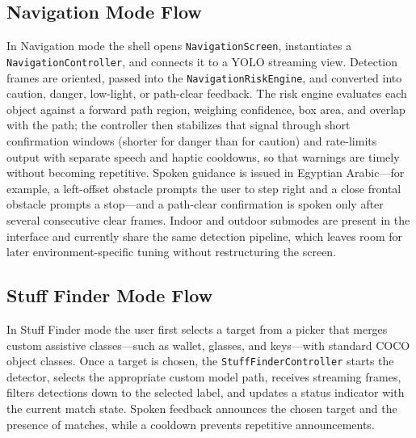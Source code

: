 \documentclass[12pt,a4paper]{report}
\begin{document}
\subsection{Navigation Mode Flow}
In Navigation mode the shell opens \texttt{NavigationScreen}, instantiates a \texttt{NavigationController}, and connects it to a YOLO streaming view. Detection frames are oriented, passed into the \texttt{NavigationRiskEngine}, and converted into caution, danger, low-light, or path-clear feedback. The risk engine evaluates each object against a forward path region, weighing confidence, box area, and overlap with the path; the controller then stabilizes that signal through short confirmation windows (shorter for danger than for caution) and rate-limits output with separate speech and haptic cooldowns, so that warnings are timely without becoming repetitive. Spoken guidance is issued in Egyptian Arabic---for example, a left-offset obstacle prompts the user to step right and a close frontal obstacle prompts a stop---and a path-clear confirmation is spoken only after several consecutive clear frames. Indoor and outdoor submodes are present in the interface and currently share the same detection pipeline, which leaves room for later environment-specific tuning without restructuring the screen.

\subsection{Stuff Finder Mode Flow}
In Stuff Finder mode the user first selects a target from a picker that merges custom assistive classes---such as wallet, glasses, and keys---with standard COCO object classes. Once a target is chosen, the \texttt{StuffFinderController} starts the detector, selects the appropriate custom model path, receives streaming frames, filters detections down to the selected label, and updates a status indicator with the current match state. Spoken feedback announces the chosen target and the presence of matches, while a cooldown prevents repetitive announcements.
\end{document}
